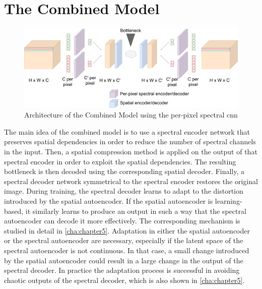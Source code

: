 \section{The Combined Model\label{sec:combinedmodel}}
\begin{figure}
\centering
\includegraphics[scale=0.18]{img/GeneralArchitecture.pdf}
\caption[Combined model architecture]{Architecture of the Combined Model using the per-pixel spectral \ac{cnn}}
\label{fig:combined}
\end{figure}

The main idea of the combined model is to use a spectral encoder network that preserves spatial dependencies in order to reduce the number of spectral channels in the input. Then, a spatial compression method is applied on the output of that spectral encoder in order to exploit the spatial dependencies. The resulting bottleneck is then decoded using the corresponding spatial decoder. Finally, a spectral decoder network symmetrical to the spectral encoder restores the original image. During training, the spectral decoder learns to adapt to the distortion introduced by the spatial autoencoder. If the spatial autoencoder is learning-based, it similarly learns to produce an output in such a way that the spectral autoencoder can decode it more effectively. The corresponding mechanism is studied in detail in \autoref{cha:chapter5}. Adaptation in either the spatial autoencoder or the spectral autoencoder are necessary, especially if the latent space of the spectral autoencoder is not continuous. In that case, a small change introduced by the spatial autoencoder could result in a large change in the output of the spectral decoder. In practice the adaptation process is successful in avoiding chaotic outputs of the spectral decoder, which is also shown in \autoref{cha:chapter5}.

